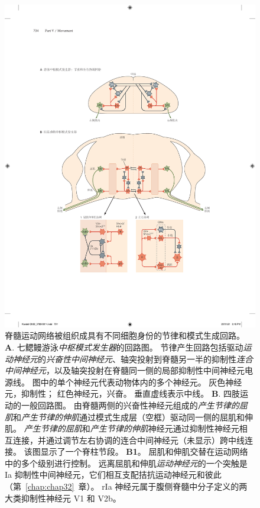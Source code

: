 \begin{figure}[htbp]
	\centering
	\includegraphics[width=0.95\linewidth]{chap33/fig_33_7}
	\caption{脊髓运动网络被组织成具有不同细胞身份的节律和模式生成回路。
	\textbf{A}. 七鳃鳗游泳\textit{中枢模式发生器}的回路图。
	节律产生回路包括驱动\textit{运动神经元}的\textit{兴奋性中间神经元}、轴突投射到脊髓另一半的抑制性\textit{连合中间神经元}，以及轴突投射在脊髓同一侧的局部抑制性中间神经元电源线。
	图中的单个神经元代表动物体内的多个神经元。
	灰色神经元，抑制性； 红色神经元，兴奋。 垂直虚线表示中线\cite{grillner2006biological}。
	\textbf{B}. 四肢运动的一般回路图。
	由脊髓两侧的兴奋性神经元组成的\textit{产生节律的屈肌}和\textit{产生节律的伸肌}通过模式生成层（空框）驱动同一侧的屈肌和伸肌。
	\textit{产生节律的屈肌}和\textit{产生节律的伸肌}神经元通过抑制性神经元相互连接，并通过调节左右协调的连合中间神经元（未显示）跨中线连接。
	该图显示了一个脊柱节段\cite{kiehn2016decoding}。
	\textbf{B1}。 屈肌和伸肌交替在运动网络中的多个级别进行控制。
	远离屈肌和伸肌\textit{运动神经元}的一个突触是 Ia 抑制性中间神经元，它们相互支配拮抗运动神经元和彼此（第~\ref{chap:chap32}~章）。
	rIa 神经元属于腹侧脊髓中分子定义的两大类抑制性神经元 V1 和 V2b。
}
\end{figure}
